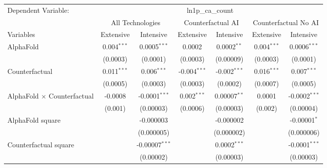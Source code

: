 \begingroup
\centering
\begin{tabular}{lcccccc}
   \tabularnewline \midrule \midrule
   Dependent Variable: & \multicolumn{6}{c}{ln1p\_ca\_count}\\
 & \multicolumn{2}{c}{All Technologies} & \multicolumn{2}{c}{Counterfactual AI} & \multicolumn{2}{c}{Counterfactual No AI} \\
\cmidrule(lr){1-1}\cmidrule(lr){2-3} \cmidrule(lr){4-5} \cmidrule(lr){6-7}
Variables & \multicolumn{1}{c}{Extensive} & \multicolumn{1}{c}{Intensive} & \multicolumn{1}{c}{Extensive} & \multicolumn{1}{c}{Intensive} & \multicolumn{1}{c}{Extensive} & \multicolumn{1}{c}{Intensive} \\
\cmidrule(lr){1-1}\cmidrule(lr){2-2} \cmidrule(lr){3-3} \cmidrule(lr){4-4} \cmidrule(lr){5-5} \cmidrule(lr){6-6} \cmidrule(lr){7-7}
   AlphaFold                          & 0.004$^{***}$ & 0.0005$^{***}$     & 0.0002         & 0.0002$^{**}$      & 0.004$^{***}$ & 0.0006$^{***}$\\   
                                      & (0.0003)      & (0.0001)           & (0.0003)       & (0.00009)          & (0.0003)      & (0.0001)\\   
   Counterfactual                     & 0.011$^{***}$ & 0.006$^{***}$      & -0.004$^{***}$ & -0.002$^{***}$     & 0.016$^{***}$ & 0.007$^{***}$\\   
                                      & (0.0005)      & (0.0003)           & (0.0003)       & (0.0002)           & (0.0007)      & (0.0005)\\   
   AlphaFold $\times$ Counterfactual  & -0.0008       & -0.0001$^{***}$    & 0.002$^{***}$  & 0.00007$^{**}$     & 0.0001        & -0.0002$^{***}$\\   
                                      & (0.001)       & (0.00003)          & (0.0006)       & (0.00003)          & (0.002)       & (0.00004)\\   
   AlphaFold square                   &               & -0.000003          &                & -0.000002          &               & -0.00001$^{*}$\\   
                                      &               & (0.000005)         &                & (0.000002)         &               & (0.000006)\\   
   Counterfactual square              &               & -0.00007$^{***}$   &                & 0.0002$^{***}$     &               & -0.0001$^{***}$\\   
                                      &               & (0.00002)          &                & (0.00003)          &               & (0.00003)\\   

\end{tabular}

